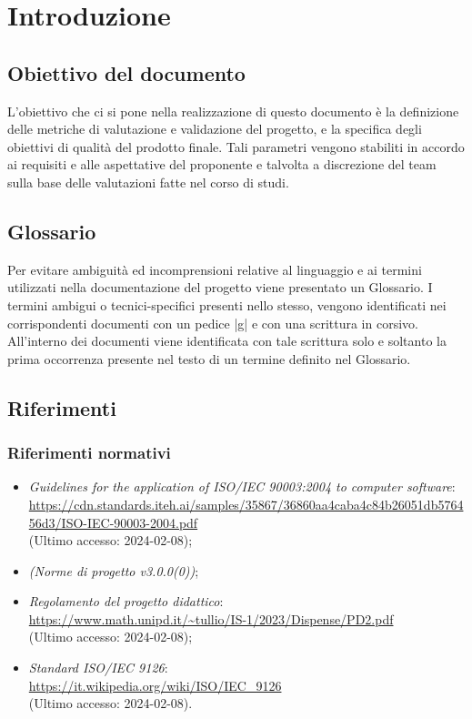\documentclass[10pt, a4paper]{article}
\title{\titolo}
\author{SWEetCode}
\begin{document}



\newpage

\tableofcontents
\newpage
\listoffigures
\newpage
\listoftables
\newpage

\section{Introduzione}
\subsection{Obiettivo del documento}
L'obiettivo che ci si pone nella realizzazione di questo documento è la definizione delle metriche di valutazione e validazione del progetto, e la specifica degli obiettivi di qualità del prodotto finale. Tali parametri vengono stabiliti in accordo ai requisiti e 
alle aspettative del proponente e talvolta a discrezione del team sulla base delle valutazioni fatte nel corso di studi.

\subsection{Glossario}
Per evitare ambiguità ed incomprensioni relative al linguaggio e ai termini utilizzati nella documentazione del progetto viene presentato un Glossario.
I termini ambigui o tecnici-specifici presenti nello stesso, vengono identificati nei corrispondenti documenti con un pedice |g| e con una scrittura in corsivo.
All'interno dei documenti viene identificata con tale scrittura solo e soltanto la prima occorrenza presente nel testo di un termine definito nel Glossario.

\subsection{Riferimenti}
   \subsubsection{Riferimenti normativi}
   \begin{itemize}
    \item \textit{Guidelines for the application of ISO/IEC 90003:2004 to computer software}: \\
        \url{https://cdn.standards.iteh.ai/samples/35867/36860aa4caba4c84b26051db576456d3/ISO-IEC-90003-2004.pdf}\\
        (Ultimo accesso: 2024-02-08);
    \item \textit{(Norme di progetto v3.0.0(0))};
    \item \textit{Regolamento del progetto didattico}: \\
        \url{https://www.math.unipd.it/~tullio/IS-1/2023/Dispense/PD2.pdf}\\
        (Ultimo accesso: 2024-02-08);
    \item \textit{Standard ISO/IEC 9126}:\\
        \url{https://it.wikipedia.org/wiki/ISO/IEC_9126}\\
        (Ultimo accesso: 2024-02-08).
    \end{itemize}
    
\end{document}
